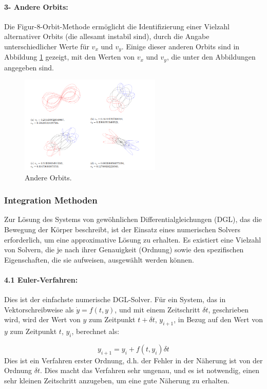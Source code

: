 \documentclass[a4paper,12pt,twoside]{article}
\begin{document}
\paragraph{3- Andere Orbits: } 
Die Figur-8-Orbit-Methode ermöglicht die Identifizierung einer Vielzahl alternativer Orbits (die allesamt instabil sind), durch die Angabe unterschiedlicher Werte für $v_x$ und $v_y$.
Einige dieser anderen Orbits sind in Abbildung \ref{Abb:andereOrbits} gezeigt, mit den Werten von $v_x$ und $v_y$, die unter den Abbildungen angegeben sind.

\begin{figure}[H]
    \centering
    \includegraphics[width=0.6\textwidth]{AndereOrbits.png}
    \caption{Andere Orbits.}
    \label{Abb:andereOrbits}
\end{figure}

\subsubsection{Integration Methoden}
Zur Lösung des Systems von gewöhnlichen Differentialgleichungen (DGL), das die Bewegung der Körper beschreibt, ist der Einsatz eines numerischen Solvers erforderlich, um eine approximative Lösung zu erhalten. Es existiert eine Vielzahl von Solvern, die je nach ihrer Genauigkeit (Ordnung) sowie den spezifischen Eigenschaften, die sie aufweisen, ausgewählt werden können.

\paragraph{4.1 Euler-Verfahren: }
Dies ist der einfachste numerische DGL-Solver. Für ein System, das in Vektorschreibweise als $ \dot{y} = f(t, y) $, und mit einem Zeitschritt $\delta t$, geschrieben wird, wird der Wert von $y$ zum Zeitpunkt $t + \delta t$, $y_{i+1}$, in Bezug auf den Wert von $y$ zum Zeitpunkt $t$, $y_i$, berechnet als:

\begin{equation*}
    y_{i+1} = y_i + f(t, y_i)\delta t
\end{equation*}
Dies ist ein Verfahren erster Ordnung, d.h. der Fehler in der Näherung ist von der Ordnung $\delta t$. Dies macht das Verfahren sehr ungenau, und es ist notwendig, einen sehr kleinen Zeitschritt anzugeben, um eine gute Näherung zu erhalten.
\end{document}
